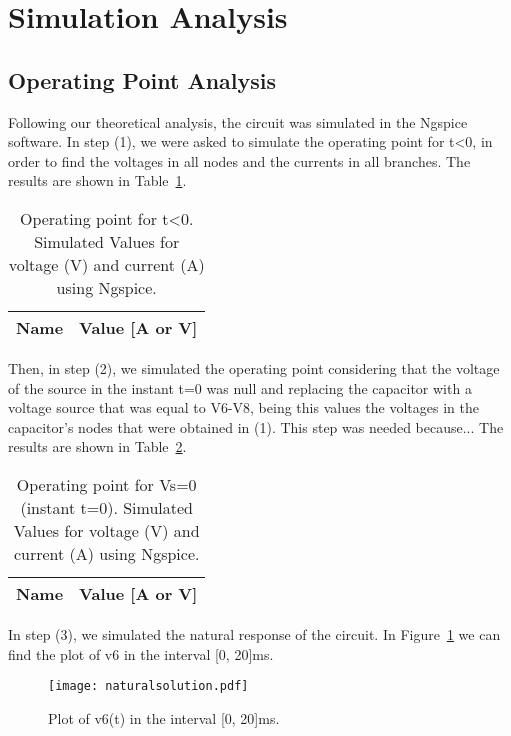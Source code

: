 \section{Simulation Analysis}
\label{sec:simulation}

\subsection{Operating Point Analysis}

Following our theoretical analysis, the circuit was simulated in the Ngspice software. 
In step (1), we were asked to simulate the operating point for t<0, in order to find the voltages in all nodes and the currents in all branches. The results are shown in Table~\ref{tab:alinea1}.

\begin{table}[h]
  \centering
  \begin{tabular}{|l|r|}
    \hline    
    {\bf Name} & {\bf Value [A or V]} \\ \hline
    
  \end{tabular}
  \caption{Operating point for t<0. Simulated Values for voltage (V) and current (A) using Ngspice.}
  \label{tab:alinea1}
\end{table}

Then, in step (2), we simulated the operating point considering that the voltage of the source in the instant t=0 was null and replacing the capacitor with a voltage source that was equal to V6-V8, being this values the voltages in the capacitor's nodes that were obtained in (1). This step was needed because... The results are shown in Table~\ref{tab:alinea2}.

\begin{table}[h]
  \centering
  \begin{tabular}{|l|r|}
    \hline    
    {\bf Name} & {\bf Value [A or V]} \\ \hline
    
  \end{tabular}
  \caption{Operating point for Vs=0 (instant t=0). Simulated Values for voltage (V) and current (A) using Ngspice.}
  \label{tab:alinea2}
\end{table}

In step (3), we simulated the natural response of the circuit. In Figure~\ref{fig:plotS(3)} we can find the plot of v6 in the interval [0, 20]ms.

\begin{figure}[h] \centering
\texttt{[image: naturalsolution.pdf]}
\caption{Plot of v6(t) in the interval [0, 20]ms.}
\label{fig:plotS(3)}
\end{figure}

